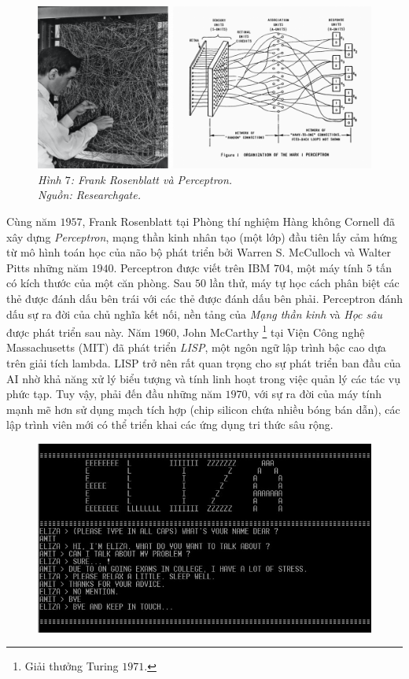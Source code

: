 \begin{multicols}{2}
	\begin{figure}[H]
		\vspace*{-5pt}
		\centering
		\captionsetup{labelformat= empty, justification=centering}
		\includegraphics[width= 1\linewidth]{perceptron_1.png}
		\caption{\small\textit{\color{cackithi}Hình $7$: Frank Rosenblatt và Perceptron.\\ Nguồn: Researchgate.}}
		\vspace*{-10pt}
	\end{figure}
	Cùng năm $1957$, Frank Rosenblatt tại Phòng thí nghiệm Hàng không Cornell đã xây dựng \textit{Perceptron}, mạng thần kinh nhân tạo (một lớp) đầu tiên lấy cảm hứng từ mô hình toán học của não bộ phát triển bởi Warren S. McCulloch và Walter Pitts những năm $1940$. Perceptron được viết trên IBM $704$, một máy tính $5$ tấn có kích thước của một căn phòng. Sau $50$ lần thử, máy tự học cách phân biệt các thẻ được đánh dấu bên trái với các thẻ được đánh dấu bên phải. Perceptron đánh dấu sự ra đời của chủ nghĩa kết nối, nền tảng của \textit{Mạng thần kinh}  và \textit{Học sâu} được phát triển sau này.
	\vskip 0.1cm
	Năm $1960$, John McCarthy \footnote{\color{cackithi}Giải thưởng Turing $1971$.} tại Viện Công nghệ Massachusetts (MIT) đã phát triển \textit{LISP}, một ngôn ngữ lập trình bậc cao dựa trên giải tích lambda. LISP trở nên rất quan trọng cho sự phát triển ban đầu của AI nhờ khả năng xử lý biểu tượng và tính linh hoạt trong việc quản lý các tác vụ phức tạp. Tuy vậy, phải đến đầu những năm $1970$, với sự ra đời của máy tính mạnh mẽ hơn sử dụng mạch tích hợp (chip silicon chứa nhiều bóng bán dẫn), các lập trình viên mới có thể triển khai các ứng dụng tri thức sâu rộng.
	\begin{figure}[H]
		\vspace*{-5pt}
		\centering
		\captionsetup{labelformat= empty, justification=centering}
		\includegraphics[width= 1\linewidth]{eliza.jpeg}

\end{figure}
\end{multicols}

